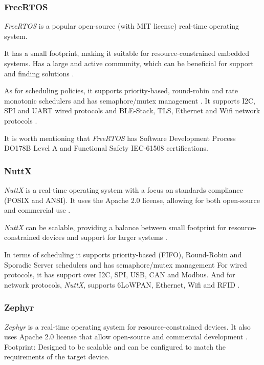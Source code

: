 \subsubsection{FreeRTOS}
\textit{FreeRTOS} is a popular open-source (with MIT license) real-time operating system.

It has a small footprint, making it suitable for resource-constrained embedded systems.
Has a large and active community, which can be beneficial for support and finding solutions \cite{RTOS6}.

As for scheduling policies, it supports priority-based, round-robin and rate monotonic schedulers and has semaphore/mutex management \cite{compRTOS}.
It supports \gls{I2C}, \gls{SPI} and \gls{UART} wired protocols and \gls{BLE}-Stack, \gls{TLS}, Ethernet and \gls{Wifi} network protocols \cite{compRTOS}.

It is worth mentioning that \textit{FreeRTOS} has Software Development Process DO178B Level A and Functional Safety IEC-61508 certifications.

\subsubsection{NuttX}
\textit{NuttX} is a real-time operating system with a focus on standards compliance (POSIX and ANSI).
It uses the Apache 2.0 license, allowing for both open-source and commercial use \cite{nuttx}.

\textit{NuttX} can be scalable, providing a balance between small footprint for resource-constrained devices and support for larger systems \cite{nuttx}.

In terms of scheduling it supports priority-based (\gls{FIFO}), Round-Robin and Sporadic Server schedulers and has semaphore/mutex management
For wired protocols, it has support over \gls{I2C}, \gls{SPI}, \gls{USB}, \gls{CAN} and Modbus.
And for network protocols, \textit{NuttX}, supports 6LoWPAN, Ethernet, \gls{Wifi} and \gls{RFID} \cite{compRTOS}.

\subsubsection{Zephyr}
\cite{RTOS5}


\textit{Zephyr} is a real-time operating system for resource-constrained devices.
It also uses Apache 2.0 license that allow open-source and commercial development \cite{zephyr}.
Footprint: Designed to be scalable and can be configured to match the requirements of the target device.

